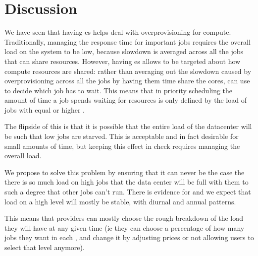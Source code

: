 \section{Discussion}


We have seen that having \priceclass{}es helps \sys{} deal with overprovisioning
for compute. Traditionally, managing the response time for important jobs
requires the overall load on the system to be low, because slowdown is averaged
across all the jobs that can share resources. However, having \class{}es allows
\sys{} to be targeted about how compute resources are shared: rather than
averaging out the slowdown caused by overprovisioning across all the jobs by
having them time share the cores, \sys{} can use \class{} to decide which job
has to wait. This means that in priority scheduling the amount of time a job
spends waiting for resources is only defined by the load of jobs with equal or
higher \class{}.

The flipside of this is that it is possible that the entire load of the
datacenter will be such that low \class{} jobs are starved. This is acceptable
and in fact desirable for small amounts of time, but keeping this effect in
check requires managing the overall load. 

We propose to solve this problem by ensuring that it can never be the case the
there is so much load on high \class{} jobs that the data center will be full
with them to such a degree that other jobs can't run. There is evidence for and
we expect that load on a high level will mostly be stable, with diurnal and
annual patterns.\cite{TODO}

This means that providers can mostly choose the rough breakdown of the load they
will have at any given time (ie they can choose a percentage of how many jobs
they want in each \class{}, and change it by adjusting prices or not allowing
users to select that level anymore). 



% 
